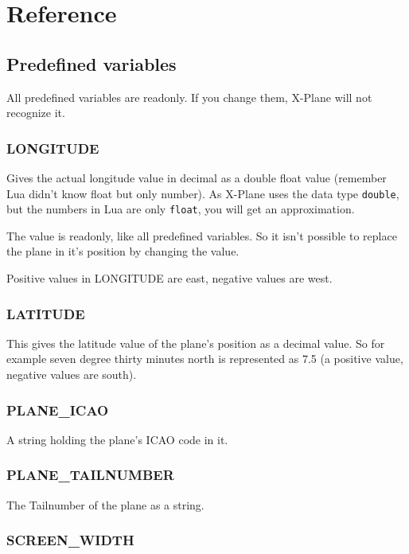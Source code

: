 \documentclass[11pt,parskip=half,a4paper]{scrartcl}
\begin{document}
\newpage
\section{Reference}
\subsection{Predefined variables}

All predefined variables are readonly. If you change them, X-Plane will not recognize it.

\subsubsection{LONGITUDE}

Gives the actual longitude value in decimal as a double float value (remember Lua didn't know float but only number). As X-Plane uses the data type \verb|double|, but the numbers in Lua are only \verb|float|, you will get an approximation.

The value is readonly, like all predefined variables. So it isn't possible to replace the plane in it's position by changing the value.

Positive values in LONGITUDE are east, negative values are west.

\subsubsection{LATITUDE}

This gives the latitude value of the plane's position as a decimal value. So for example seven degree thirty minutes north is represented as 7.5 (a positive value, negative values are south).

\subsubsection{PLANE\_ICAO}

A string holding the plane's ICAO code in it.

\subsubsection{PLANE\_TAILNUMBER}

The Tailnumber of the plane as a string.

\subsubsection{SCREEN\_WIDTH}
\end{document}
